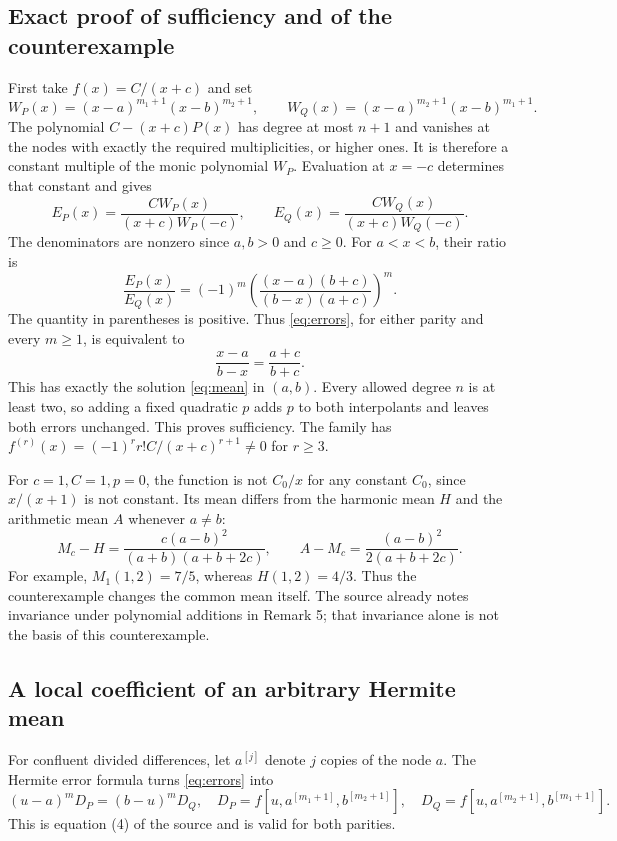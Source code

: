 \documentclass[11pt]{article}
\begin{document}
\subsection*{Exact proof of sufficiency and of the counterexample}
First take $f(x)=C/(x+c)$ and set
\[
 W_P(x)=(x-a)^{m_1+1}(x-b)^{m_2+1},\qquad
 W_Q(x)=(x-a)^{m_2+1}(x-b)^{m_1+1}.
\]
The polynomial $C-(x+c)P(x)$ has degree at most $n+1$ and vanishes
at the nodes with exactly the required multiplicities, or higher ones.
It is therefore a constant multiple of the monic polynomial $W_P$.
Evaluation at $x=-c$ determines that constant and gives
\begin{equation}\label{eq:exact-remainder}
 E_P(x)=\frac{C W_P(x)}{(x+c)W_P(-c)},\qquad
 E_Q(x)=\frac{C W_Q(x)}{(x+c)W_Q(-c)}.
\end{equation}
The denominators are nonzero since $a,b>0$ and $c\ge0$.
For $a<x<b$, their ratio is
\[
 \frac{E_P(x)}{E_Q(x)}
 =(-1)^m\left(\frac{(x-a)(b+c)}{(b-x)(a+c)}\right)^m.
\]
The quantity in parentheses is positive. Thus \eqref{eq:errors}, for
either parity and every $m\ge1$, is equivalent to
\[
 \frac{x-a}{b-x}=\frac{a+c}{b+c}.
\]
This has exactly the solution \eqref{eq:mean} in $(a,b)$.
Every allowed degree $n$ is at least two, so adding a fixed quadratic
$p$ adds $p$ to both interpolants and leaves both errors unchanged.
This proves sufficiency. The family has
$f^{(r)}(x)=(-1)^r r!C/(x+c)^{r+1}\ne0$ for $r\ge3$.

For $c=1,C=1,p=0$, the function is not $C_0/x$ for any constant
$C_0$, since $x/(x+1)$ is not constant. Its mean differs from the
harmonic mean $H$ and the arithmetic mean $A$ whenever $a\ne b$:
\begin{equation}\label{eq:differences}
 M_c-H=\frac{c(a-b)^2}{(a+b)(a+b+2c)},\qquad
 A-M_c=\frac{(a-b)^2}{2(a+b+2c)}.
\end{equation}
For example, $M_1(1,2)=7/5$, whereas $H(1,2)=4/3$.
Thus the counterexample changes the common mean itself. The source
already notes invariance under polynomial additions in Remark 5;
that invariance alone is not the basis of this counterexample.

\subsection*{A local coefficient of an arbitrary Hermite mean}
For confluent divided differences, let $a^{[j]}$ denote $j$ copies
of the node $a$. The Hermite error formula turns \eqref{eq:errors} into
\begin{equation}\label{eq:divided}
 (u-a)^m D_P=(b-u)^m D_Q,
\quad D_P=f[u,a^{[m_1+1]},b^{[m_2+1]}],
\quad D_Q=f[u,a^{[m_2+1]},b^{[m_1+1]}].
\end{equation}
This is equation (4) of the source and is valid for both parities.
\end{document}
